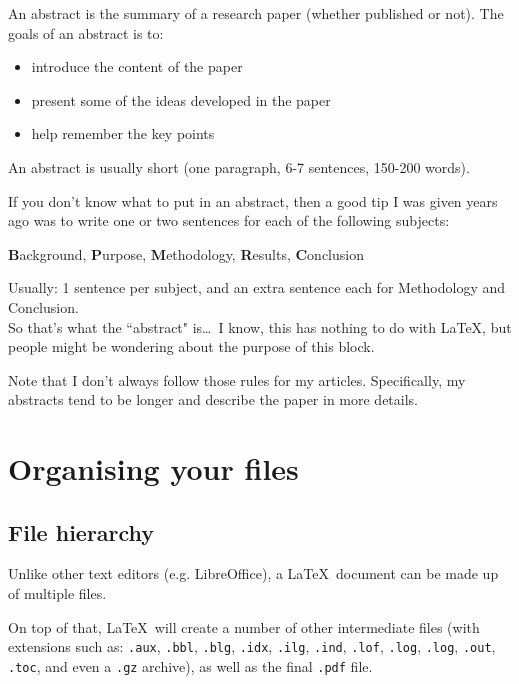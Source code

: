 An abstract is the summary of a research paper (whether published or not). The goals of an abstract is to:
\begin{itemize}
	\item introduce the content of the paper
	\item present some of the ideas developed in the paper
	\item help remember the key points
\end{itemize}

\medskip

An abstract is usually short (one paragraph, 6-7 sentences, 150-200 words). \\


\medskip


If you don't know what to put in an abstract, then a good tip I was given years ago was to
write one or two sentences for each of the following subjects:

\begin{center}
\textbf{B}ackground, \textbf{P}urpose, \textbf{M}ethodology, \textbf{R}esults, \textbf{C}onclusion 
\end{center}

Usually: 1 sentence per subject, and an extra sentence each for Methodology and Conclusion. \\


So that's what the ``abstract" is\dots\ I know, this has nothing to do with \LaTeX, but people might be wondering about the purpose of this block. \\
\medskip

Note that I don't always follow those rules for my articles. Specifically, my abstracts tend to be longer and describe the paper in more details.

\bigskip


\section{Organising your files} \label{getting-organised}


\subsection{File hierarchy}

Unlike other text editors (e.g. LibreOffice), a \LaTeX\ document can be made up of multiple files.

On top of that, \LaTeX\ will create a number of other intermediate files (with extensions such as: \texttt{.aux}, \texttt{.bbl}, \texttt{.blg}, \texttt{.idx}, \texttt{.ilg}, \texttt{.ind}, \texttt{.lof}, \texttt{.log}, \texttt{.log}, \texttt{.out}, \texttt{.toc}, and even a \texttt{.gz} archive), as well as the final \texttt{.pdf} file. \\

